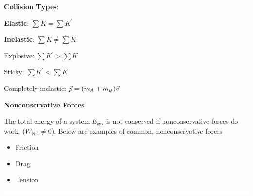 \documentclass[	DIV=calc,%
							paper=a4,%
							fontsize=11pt,%
							twocolumn]{scrartcl} %
\newcommand{\hformbar}[1]{\vspace{5pt}\hrule\vspace{10pt}} %
\newcommand{\pvec}[1]{\vec{#1}\mkern2mu\vphantom{#1}}
\begin{document}
\textbf{Collision Types}:
        
        \qquad\textbf{Elastic}: $\sum K = \sum K^\prime$  
        
        \qquad\textbf{Inelastic}: $\sum K\ne\sum K^\prime$
            
            \qquad\qquad Explosive: $\sum K^\prime > \sum K$

            \qquad\qquad Sticky: $\sum K^\prime < \sum K$

            \qquad\qquad Completely inelastic: $\vec p = (m_A+m_B)\pvec{v}$

\textbf{Nonconservative Forces}

\quad The total energy of a system $E_\text{sys}$ is not conserved if nonconservative       forces do work, ($W_{\text{NC}}\ne 0$). Below are examples of common, nonconservative forces
\begin{itemize}
    \item Friction
    \item Drag
    \item Tension
\end{itemize}
        
    \hformbar{}
    
\end{document}
